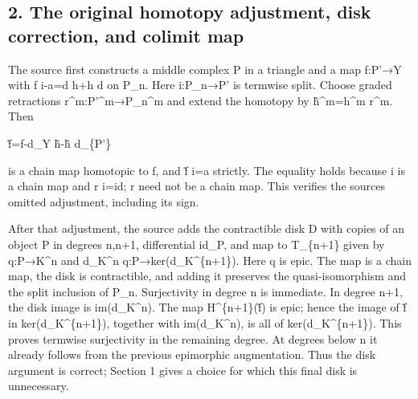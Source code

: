 \subsection{\texorpdfstring{2. The original homotopy adjustment,\allowbreak{} disk correction,\allowbreak{} and colimit map}{2. The original homotopy  disk  and colimit map}}\label{proofs-9206-9744-the-original-homotopy-adjustment-disk-correction-and-colimit-map}

The source first constructs a middle complex P\textquotesingle{} in a triangle and a map f:\allowbreak{}P'\allowbreak{}→Y with f i-a\allowbreak{}=d h\allowbreak{}+h d on P\_\allowbreak{}n. Here i:\allowbreak{}P\_\allowbreak{}n\allowbreak{}→P' is termwise split. Choose graded retractions r\textasciicircum{}m:\allowbreak{}P'\textasciicircum{}m\allowbreak{}→P\_\allowbreak{}n\textasciicircum{}m and extend the homotopy by h̃\textasciicircum{}m\allowbreak{}=h\textasciicircum{}m r\^{}m. Then

f̃\allowbreak{}=f-d\_\allowbreak{}Y h̃-h̃ d\_\allowbreak{}\{P'\}

is a chain map homotopic to f,\allowbreak{} and f̃ i\allowbreak{}=a strictly. The equality holds because i is a chain map and r i\allowbreak{}=id; r need not be a chain map. This verifies the source\textquotesingle s omitted adjustment,\allowbreak{} including its sign.

After that adjustment,\allowbreak{} the source adds the contractible disk D with copies of an object P in degrees n,\allowbreak{}n\allowbreak{}+1,\allowbreak{} differential id\_\allowbreak{}P,\allowbreak{} and map to T\_\allowbreak{}\{n\allowbreak{}+1\} given by q:\allowbreak{}P\allowbreak{}→K\textasciicircum{}n and d\_\allowbreak{}K\textasciicircum{}n q:\allowbreak{}P\allowbreak{}→ker(d\_\allowbreak{}K\textasciicircum{}\{n\allowbreak{}+1\})\allowbreak{}. Here q is epic. The map is a chain map,\allowbreak{} the disk is contractible,\allowbreak{} and adding it preserves the quasi-isomorphism and the split inclusion of P\_\allowbreak{}n. Surjectivity in degree n is immediate. In degree n\allowbreak{}+1,\allowbreak{} the disk image is im(d\_\allowbreak{}K\textasciicircum{}n)\allowbreak{}. The map H\textasciicircum{}\{n\allowbreak{}+1\}(f̃)\allowbreak{} is epic; hence the image of f̃ in ker(d\_\allowbreak{}K\textasciicircum{}\{n\allowbreak{}+1\})\allowbreak{},\allowbreak{} together with im(d\_\allowbreak{}K\textasciicircum{}n)\allowbreak{},\allowbreak{} is all of ker(d\_\allowbreak{}K\textasciicircum{}\{n\allowbreak{}+1\})\allowbreak{}. This proves termwise surjectivity in the remaining degree. At degrees below n it already follows from the previous epimorphic augmentation. Thus the disk argument is correct; Section 1 gives a choice for which this final disk is unnecessary.

